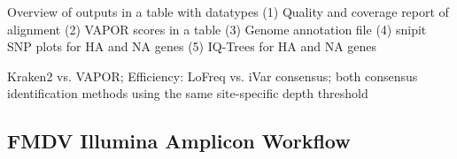 Overview of outputs in a table with datatypes
(1) Quality and coverage report of alignment
(2) VAPOR scores in a table
(3) Genome annotation file
(4) snipit SNP plots for HA and NA genes
(5) IQ-Trees for HA and NA genes

Kraken2 vs. VAPOR;
Efficiency: LoFreq vs. iVar consensus; both consensus identification methods using the same site-specific depth threshold


\subsection{FMDV Illumina Amplicon Workflow}
